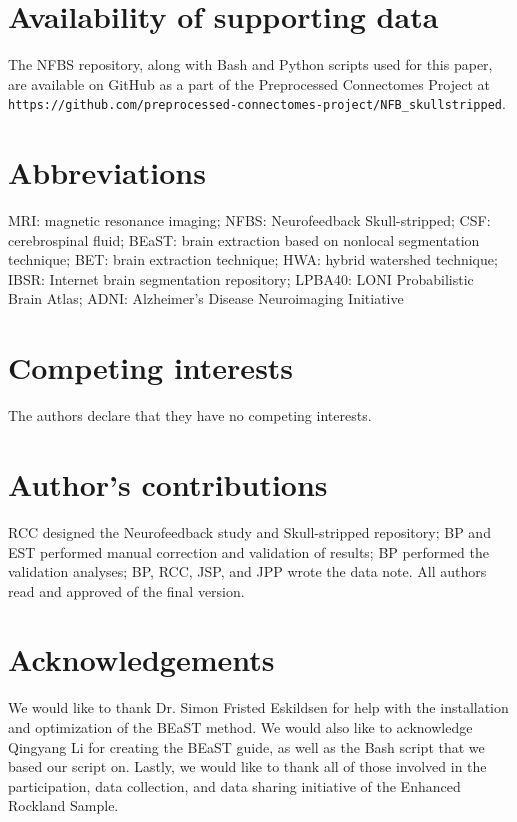 \documentclass{bmcart}
\begin{document}
\section*{Availability of supporting data}
The NFBS repository, along with Bash and Python scripts used for this paper, are available on GitHub as a part of the Preprocessed Connectomes Project \cite{Github} at {\tt https://github.com/preprocessed-connectomes-project/NFB\_skullstripped}.


\begin{backmatter}

\section*{Abbreviations}
  MRI: magnetic resonance imaging; NFBS: Neurofeedback Skull-stripped; CSF: cerebrospinal fluid; BEaST: brain extraction based on nonlocal segmentation technique; BET: brain extraction technique; HWA: hybrid watershed technique; IBSR: Internet brain segmentation repository; LPBA40: LONI Probabilistic Brain Atlas; ADNI: Alzheimer's Disease Neuroimaging Initiative

\section*{Competing interests}
  The authors declare that they have no competing interests.

\section*{Author's contributions}
    RCC designed the Neurofeedback study and Skull-stripped repository;  BP and EST performed manual correction and validation of results; BP performed the validation analyses; BP, RCC, JSP, and JPP wrote the data note. All authors read and approved of the final version.

\section*{Acknowledgements}
  We would like to thank Dr. Simon Fristed Eskildsen for help with the installation and optimization of the BEaST method. We would also like to acknowledge Qingyang Li for creating the BEaST guide, as well as the Bash script that we based our script on. Lastly, we would like to thank all of those involved in the participation, data collection, and data sharing initiative of the Enhanced Rockland Sample.
  

\end{backmatter}
\end{document}
